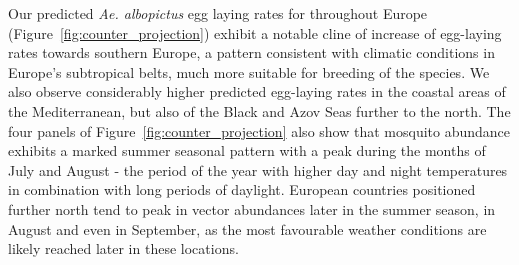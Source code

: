 \documentclass[preprint,12pt]{elsarticle}
\begin{document}
Our predicted \textit{Ae. albopictus} egg laying rates for throughout Europe (Figure~\ref{fig:counter_projection}) exhibit a notable cline of increase of egg-laying rates towards southern Europe, a pattern consistent with climatic conditions in Europe's subtropical belts, much more suitable for breeding of the species. We also observe considerably higher predicted egg-laying rates in the coastal areas of the Mediterranean, but also of the Black and Azov Seas further to the north. The four panels of Figure~\ref{fig:counter_projection} also show that mosquito abundance exhibits a marked summer seasonal pattern with a peak during the months of July and August - the period of the year with higher day and night temperatures in combination with long periods of daylight. European countries positioned further north tend to peak in vector abundances later in the summer season, in August and even in September, as the most favourable weather conditions are likely reached later in these locations. 
\end{document}
